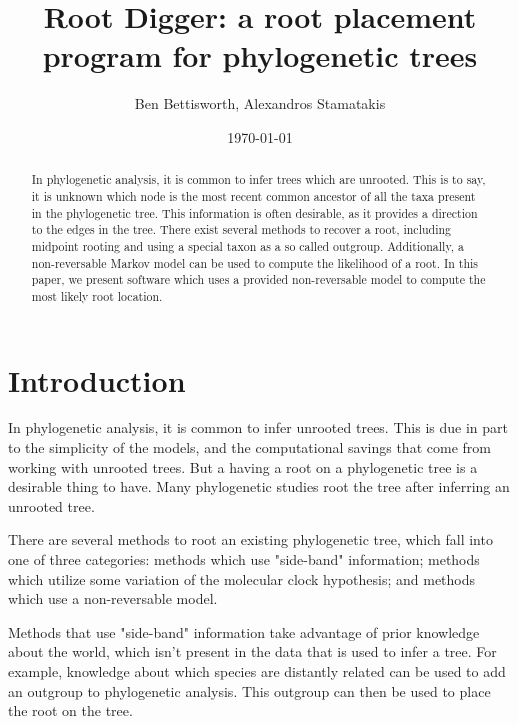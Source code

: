 \documentclass{article}
\title{Root Digger: a root placement program for phylogenetic trees}
\author{Ben Bettisworth, Alexandros Stamatakis}
\date{\today}
\begin{document}
\begin{abstract}
In phylogenetic analysis, it is common to infer trees which are unrooted. This
is to say, it is unknown which node is the most recent common ancestor of all
the taxa present in the phylogenetic tree. This information is often desirable,
as it provides a direction to the edges in the tree.  There exist several
methods to recover a root, including midpoint rooting and using a special taxon
as a so called outgroup. Additionally, a non-reversable Markov model can be used
to compute the likelihood of a root. In this paper, we present software which
uses a provided non-reversable model to compute the most likely root location.
\end{abstract}

\maketitle



\section{Introduction}


In phylogenetic analysis, it is common to infer unrooted trees. This is due in
part to the simplicity of the models, and the computational savings that come
from working with unrooted trees. But a having a root on a phylogenetic tree is
a desirable thing to have. Many phylogenetic studies root the tree after
inferring an unrooted tree.

There are several methods to root an existing phylogenetic tree, which fall into
one of three categories: methods which use "side-band" information; methods
which utilize some variation of the molecular clock hypothesis; and methods
which use a non-reversable model.

Methods that use "side-band" information take advantage of prior knowledge about
the world, which isn't present in the data that is used to infer a tree. For
example, knowledge about which species are distantly related can be used to add
an outgroup to phylogenetic analysis. This outgroup can then be used to place
the root on the tree.
\end{document}
